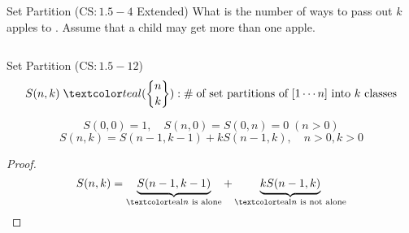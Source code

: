 
\begin{frame}{}
  \begin{exampleblock}{Set Partition ($\text{CS}: 1.5-4$ Extended)}
    What is the number of ways to pass out $k$  apples to . 
    Assume that a child may get more than one apple.
  \end{exampleblock}

  \pause

  \begin{columns}
  \end{columns}

  \pause
  \vspace{0.50cm}
  \centerline{}
\end{frame}

\begin{frame}{}
  \begin{exampleblock}{Set Partition ($\text{CS}: 1.5-12$)}
    \[
      S(n,k) \;\teal{(\stirling{n}{k})}: \#\; \text{of set partitions of $[1 \cdots n]$ into $k$ classes}
    \]
  \end{exampleblock}

  \pause
  \vspace{0.30cm}
  \centerline{}

  \pause
  \vspace{0.30cm}
  \begin{theorem}
    \[
      S(0,0) = 1, \quad S(n,0) = S(0,n) = 0 \; (n > 0)
    \]
    \[
      S(n,k) = S(n-1, k-1) + k S(n-1, k), \quad n > 0, k > 0
    \]
  \end{theorem}

  \pause
  \begin{proof}
    \[
      S(n,k) = \underbrace{S(n-1, k-1)}_{\text{\teal{$n$ is alone}}} + \underbrace{k S(n-1, k)}_{\text{\teal{$n$ is not alone}}}
    \]
  \end{proof}
\end{frame}

